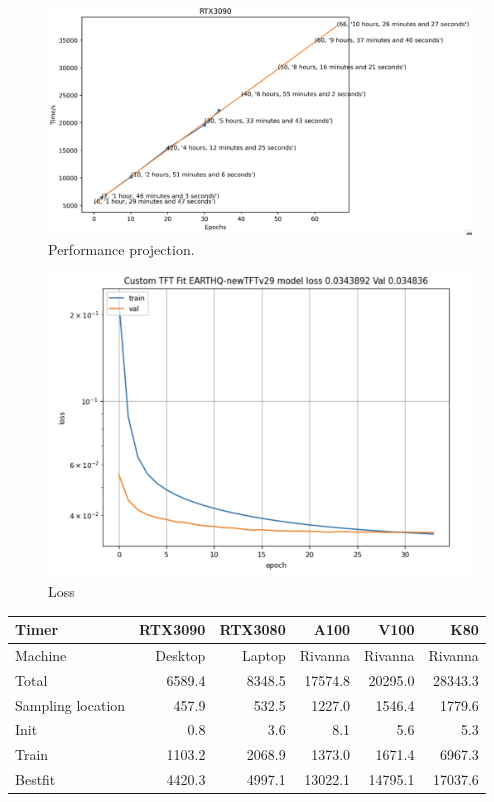 \documentclass[utf8]{FrontiersinVancouver} %
\begin{document}
\begin{figure}[htb]
    \centering
    \includegraphics[width=0.70\columnwidth]{images/performance-projection.png}
    \caption{Performance projection. }
    \label{fig:performance-projection}
\end{figure}


\begin{figure}[htb]
    \centering
    \includegraphics[width=0.70\columnwidth]{images/loss.png}
    \caption{Loss}
    \label{fig:loss}
  \end{figure}


  \begin{table}[htb]
    \caption{Runtime of the 2 epoch case in seconds}
    {\footnotesize              
      \begin{center}
        \begin{table}[]
          \begin{tabular}{lrrrrr}
            Timer             & RTX3090 & RTX3080 & A100    & V100    & K80     \\
            \hline
            Machine           & Desktop & Laptop  & Rivanna & Rivanna & Rivanna \\
            Total             & 6589.4  & 8348.5  & 17574.8 & 20295.0 & 28343.3 \\
            Sampling location &  457.9  &  532.5  &  1227.0 &  1546.4 &  1779.6 \\
            Init              &    0.8  &    3.6  &    8.1  &     5.6 &     5.3 \\
            Train             & 1103.2  & 2068.9  &  1373.0 &  1671.4 &  6967.3 \\
            Bestfit           & 4420.3  & 4997.1  & 13022.1 & 14795.1 & 17037.6 \\
            \hline
          \end{tabular}
        \end{table}
        \end{center} 
    }
\end{table}
\end{document}
